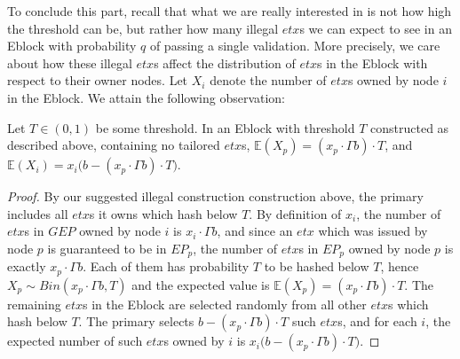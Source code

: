 To conclude this part, recall that what we are really interested in is not how high the threshold can be, but rather how many illegal $etx$s we can expect to see in an Eblock with probability $q$ of passing a single validation. More precisely, we care about how these illegal $etx$s affect the distribution of $etx$s in the Eblock with respect to their owner nodes. Let $X_i$ denote the number of $etx$s owned by node $i$ in the Eblock. We attain the following observation:
\begin{claim}
	Let $T\in (0,1)$ be some threshold. In an Eblock with threshold $T$ constructed as described above, containing no tailored $etx$s, $\mathbb{E}(X_p)=(x_p\cdot\Gamma b)\cdot T$, and $\mathbb{E}(X_i)=x_i\big(b-(x_p\cdot\Gamma b)\cdot T\big)$.
\end{claim}
\begin{proof}
	By our suggested illegal construction construction above, the primary includes all $etx$s it owns which hash below $T$. By definition of $x_i$, the number of $etx$s in $GEP$ owned by node $i$ is $x_i\cdot \Gamma b$, and since an $etx$ which was issued by node $p$ is guaranteed to be in $EP_p$, the number of $etx$s in $EP_p$ owned by node $p$ is exactly $x_p\cdot\Gamma b$. Each of them has probability $T$ to be hashed below $T$, hence $X_p\sim Bin(x_p\cdot\Gamma b, T)$ and the expected value is $\mathbb{E}(X_p)=(x_p\cdot\Gamma b)\cdot T$. The remaining $etx$s in the Eblock are selected randomly from all other $etx$s which hash below $T$. The primary selects $b-(x_p\cdot\Gamma b)\cdot T$ such $etx$s, and for each $i$, the expected number of such $etx$s owned by $i$ is $x_i\big(b-(x_p\cdot\Gamma b)\cdot T\big)$.
\end{proof}





